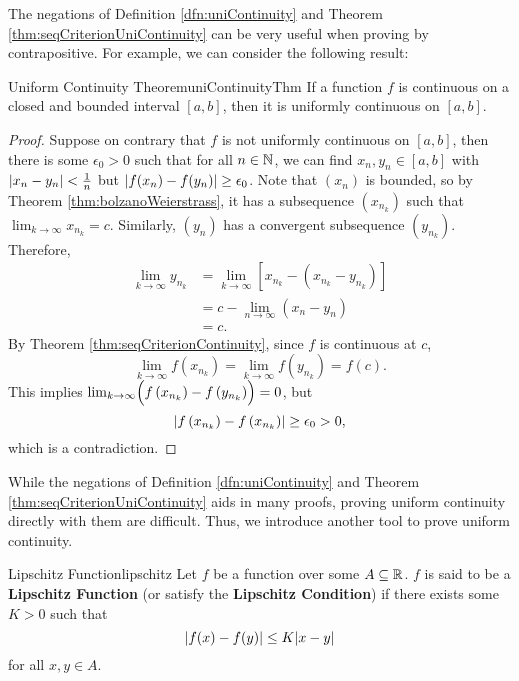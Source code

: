 \documentclass[math]{amznotes}
\theoremstyle{remark}
\begin{document}
The negations of Definition \ref{dfn:uniContinuity} and Theorem \ref{thm:seqCriterionUniContinuity} can be very useful when proving by contrapositive. For example, we can consider the following result:
\begin{thmbox}{Uniform Continuity Theorem}{uniContinuityThm}
    If a function $f$ is continuous on a closed and bounded interval $[a, b]$, then it is uniformly continuous on $[a, b]$.
    \tcblower
    \begin{proof}
        Suppose on contrary that $f$ is not uniformly continuous on $[a, b]$, then there is some $\epsilon_0 > 0$ such that for all $n \in \mathbb{N}$, we can find $x_n, y_n \in [a, b]$ with ${\left\lvert {x_n - y_n} \right\rvert} < \frac{1}{n}$ but ${\left\lvert {f(x_n) - f(y_n)} \right\rvert} \geq \epsilon_0$. Note that $(x_n)$ is bounded, so by Theorem \ref{thm:bolzanoWeierstrass}, it has a subsequence $\left(x_{n_k}\right)$ such that $\lim_{k \to \infty}x_{n_k} = c$. Similarly, $(y_n)$ has a convergent subsequence $\left(y_{n_k}\right)$. Therefore,
        \begin{align*}
            \lim_{k \to \infty}y_{n_k} & = \lim_{k \to \infty}\left[x_{n_k} - \left(x_{n_k} - y_{n_k}\right)\right] \\ 
            & = c - \lim_{n \to \infty}(x_n - y_n) \\
            & = c.
        \end{align*}
        By Theorem \ref{thm:seqCriterionContinuity}, since $f$ is continuous at $c$, 
        \begin{equation*}
            \lim_{k \to \infty}f\left(x_{n_k}\right) = \lim_{k \to \infty}f\left(y_{n_k}\right) = f(c).
        \end{equation*}
        This implies $\lim_{k \to \infty}\Bigl(f\left(x_{n_k}\right) - f\left(y_{n_k}\right)\Bigr) = 0$, but
        \begin{equation*}
            {\left\lvert {f\left(x_{n_k}\right) - f\left(x_{n_k}\right)} \right\rvert} \geq \epsilon_0 > 0,
        \end{equation*}
        which is a contradiction.
    \end{proof}
\end{thmbox}
While the negations of Definition \ref{dfn:uniContinuity} and Theorem \ref{thm:seqCriterionUniContinuity} aids in many proofs, proving uniform continuity directly with them are difficult. Thus, we introduce another tool to prove uniform continuity.
\begin{dfnbox}{Lipschitz Function}{lipschitz}
    Let $f$ be a function over some $A \subseteq \mathbb{R}$. $f$ is said to be a {\color{red} \textbf{Lipschitz Function}} (or satisfy the {\color{red} \textbf{Lipschitz Condition}}) if there exists some $K > 0$ such that
    \begin{equation*}
        {\left\lvert {f(x) - f(y)} \right\rvert} \leq K{\left\lvert {x - y} \right\rvert}
    \end{equation*}
    for all $x, y \in A$.
\end{dfnbox}
\end{document}
